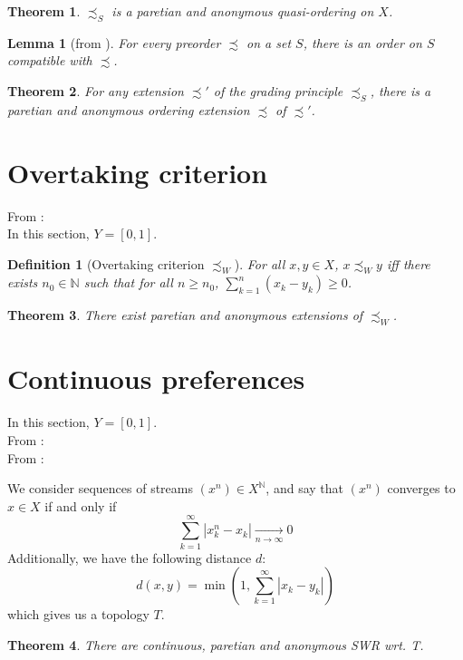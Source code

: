 \documentclass{article}
\newtheorem{definition}{Definition}
\newtheorem{theorem}{Theorem}
\newtheorem{lemma}{Lemma}
\begin{document}
\begin{theorem}
    $\precsim_S$ is a paretian and anonymous quasi-ordering on $X$.
\end{theorem}

\begin{lemma}[from \cite{szpilrajn30}]
    For every preorder $\precsim$ on a set $S$, there is an order on
    $S$ compatible with $\precsim$.
\end{lemma}

\begin{theorem}
    For any extension $\precsim'$ of the grading principle 
    $\precsim_S$, there is a paretian
    and anonymous ordering extension $\precsim$ of $\precsim'$.
\end{theorem}


\section{Overtaking criterion}

From \cite{svensson80}:\bigskip\\
In this section, $Y=[0,1]$.

\begin{definition}[Overtaking criterion $\precsim_W$]
    For all $x,y\in X$, $x \precsim_W y$ iff there exists
    $n_0\in\mathbb{N}$ such that for all $n\geq n_0$,
    $\sum_{k=1}^n (x_k - y_k)\geq 0$.
\end{definition}

\begin{theorem}
    There exist paretian and anonymous extensions of $\precsim_W$.
\end{theorem}


\section{Continuous preferences}
In this section, $Y=[0,1]$.
\smallskip\\
From \cite{diamond65}:
\bigskip\\
From \cite{svensson80}:\smallskip\par
We consider sequences of streams $(x^n)\in X^\mathbb{N}$, and say that
$(x^n)$ converges to $x\in X$ if and only if
\[\sum_{k=1}^\infty |x^n_k - x_k| \underset{n\rightarrow\infty}{\rightarrow}0\]
Additionally, we have the following distance $d$:
\[d(x,y)=\min\left(1,\sum_{k=1}^\infty |x_k - y_k|\right)\]
which gives us a topology $T$.

\begin{theorem}
    There are continuous, paretian and anonymous SWR wrt. T. 
\end{theorem}



\end{document}
